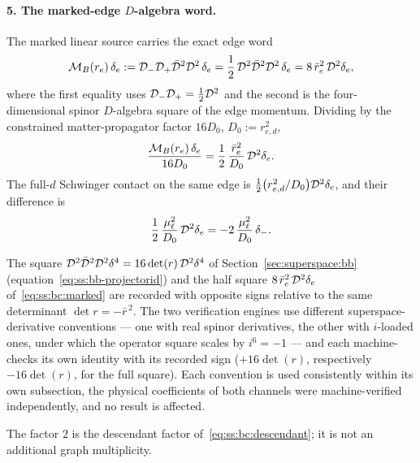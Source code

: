 \paragraph{5. The marked-edge $D$-algebra word.}
The marked linear source carries the exact edge word
\begin{equation}\label{eq:ss:bc:marked}
\mathcal M_{B}(r_{e})\,\delta_{e}
:=\mathcal{D}_{-}\mathcal{D}_{+}\bar{\mathcal{D}}^{2}\mathcal{D}^{2}\,\delta_{e}
=\frac12\,\mathcal{D}^{2}\bar{\mathcal{D}}^{2}\mathcal{D}^{2}\,\delta_{e}
=8\,\bar r_{e}^{2}\,\mathcal{D}^{2}\delta_{e} ,
\end{equation}
where the first equality uses $\mathcal{D}_{-}\mathcal{D}_{+}=\tfrac12\mathcal{D}^{2}$ and the second
is the four-dimensional spinor $D$-algebra square of the edge momentum.
Dividing by the constrained matter-propagator factor $16D_{0}$,
$D_{0}:=r_{e,d}^{2}$,
\begin{equation}\label{eq:ss:bc:markedover}
\frac{\mathcal M_{B}(r_{e})\,\delta_{e}}{16D_{0}}
=\frac12\,\frac{\bar r_{e}^{2}}{D_{0}}\,\mathcal{D}^{2}\delta_{e} .
\end{equation}
The full-$d$ Schwinger contact on the same edge is
$\tfrac12\big(r_{e,d}^{2}/D_{0}\big)\mathcal{D}^{2}\delta_{e}$, and their difference
is
\begin{equation}\label{eq:ss:bc:markeddiff}
\frac12\,\frac{\mu_\ell^{2}}{D_{0}}\,\mathcal{D}^{2}\delta_{e}
=-2\,\frac{\mu_\ell^{2}}{D_{0}}\,\delta_{-} .
\end{equation}
\begin{remark}%
\label{rem:ss:bc:detsign}
The square $\mathcal{D}^{2}\bar{\mathcal{D}}^{2}\mathcal{D}^{2}\delta^{4}=16\det(r)\,\mathcal{D}^{2}\delta^{4}$ of
Section~\ref{sec:superspace:bb} (equation~\eqref{eq:ss:bb-projectorid}) and
the half square $8\,\bar r_{e}^{2}\,\mathcal{D}^{2}\delta_{e}$
of~\eqref{eq:ss:bc:marked} are recorded with opposite signs relative to the
same determinant $\det r=-\bar r^{\,2}$. The two verification engines use
different superspace-derivative conventions --- one with real spinor
derivatives, the other with $i$-loaded ones, under which the operator square
scales by $i^{6}=-1$ --- and each machine-checks its own identity with its
recorded sign ($+16\det(r)$, respectively $-16\det(r)$, for the full square).
Each convention is used consistently within its own subsection, the physical
coefficients of both channels were machine-verified independently, and no
result is affected.
\end{remark}
The factor $2$ is the descendant factor of~\eqref{eq:ss:bc:descendant}; it is
not an additional graph multiplicity.

